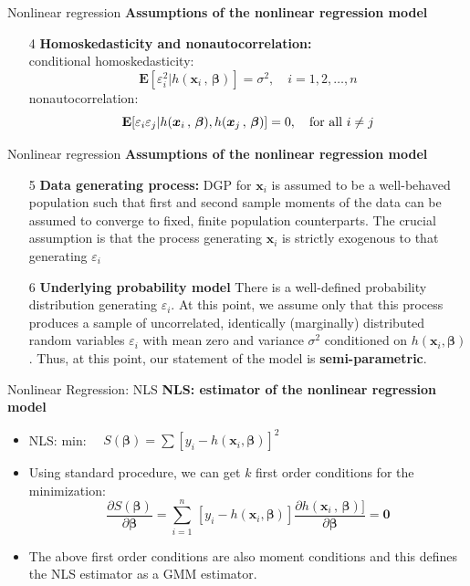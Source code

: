 \documentclass{beamer}
\begin{document}
\begin{frame}{Nonlinear regression}
\textbf{Assumptions of the nonlinear regression model}\\
\medskip
\begin{itemize}
 \item[4] \textbf{Homoskedasticity and nonautocorrelation:}\\
 \medskip
 conditional homoskedasticity:
 $$
 \mathbf{E}[\varepsilon_i^2| h(\bm{x}_i\, , \,\bm{\beta})] = \sigma^2, \quad i=1,2,\dots,n
 $$
 nonautocorrelation:
 $$
 \mathbf{E}[\varepsilon_i\varepsilon_j| h(\bm{x}_i\, , \,\bm{\beta}), h(\bm{x}_j\, , \,\bm{\beta})] = 0, \quad \textnormal{for all~}i\neq j
 $$
\end{itemize}
\end{frame}
\begin{frame}{Nonlinear regression}
\textbf{Assumptions of the nonlinear regression model}\\
\medskip
\begin{itemize}
\item[5] \textbf{Data generating process:} DGP for $\bm{x}_i$ is assumed to be a well-behaved population such that first and second sample moments of the data can be assumed to converge to fixed, finite population counterparts. The crucial assumption is that the process generating $\bm{x}_i$ is strictly exogenous to that generating $\varepsilon_i$
\item[6] \textbf{Underlying probability model} There is a well-defined probability distribution generating $\varepsilon_i$. At this point, we assume only that this process produces a sample of uncorrelated, identically (marginally) distributed random variables $\varepsilon_i$ with mean zero and variance $\sigma^2$ conditioned on $h(\bm{x}_i, \bm{\beta})$. Thus, at this point, our statement of the model is \textbf{semi-parametric}.
\end{itemize}
\end{frame}
\begin{frame}{Nonlinear Regression: NLS}
\textbf{NLS: estimator of the nonlinear regression model}\\
\bigskip
\begin{itemize}
\item NLS: \qquad min:~~ $S(\bm{\beta})=\sum[y_i-h(\bm{x}_i, \bm{\beta})]^2$
\medskip
\item Using standard procedure, we can get $k$ first order conditions for the minimization:
$$
\frac{\partial S(\bm{\beta})}{\partial \bm{\beta} } = 
\sum_{i=1}^n \, [y_i-h(\bm{x}_i, \bm{\beta})] 
\frac{\partial h(\bm{x}_i\, , \,\bm{\beta})]}{\partial \bm{\beta}}
= \bm{0}
$$

\end{itemize}
\smallskip
\begin{itemize}
\item The above first order conditions are also moment conditions and this defines the NLS estimator as a GMM estimator.
\end{itemize}
\end{frame}
\end{document}
